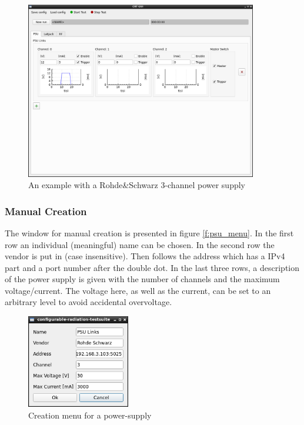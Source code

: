 \documentclass[10pt,a4paper]{article}
\begin{document}
	\begin{figure}[H]
\centering
\includegraphics[width=0.9\textwidth]{./2_PSU_example.png}
\caption{An example with a Rohde\&Schwarz 3-channel power supply}
\label{f:psu_example}
	\end{figure}	 
	
	\subsubsection{Manual Creation}	
	\label{c:psu_manual_creation}
	
	The window for manual creation is presented in figure \eqref{f:psu_menu}. In the first row an individual (meaningful) name can be chosen. In the second row the vendor is put in (case insensitive). Then follows the address which has a IPv4 part and a port number after the double dot. In the last three rows, a description of the power supply is given with the number of channels and the maximum voltage/current. The voltage here, as well as the current, can be set to an arbitrary level to avoid accidental overvoltage.
	
	\begin{figure}[H]
	\centering
	\includegraphics[width=0.4\textwidth]{./2_PSU_menu.png}
	\caption{Creation menu for a power-supply}
	\label{f:psu_menu}
	\end{figure}
	
\end{document}
